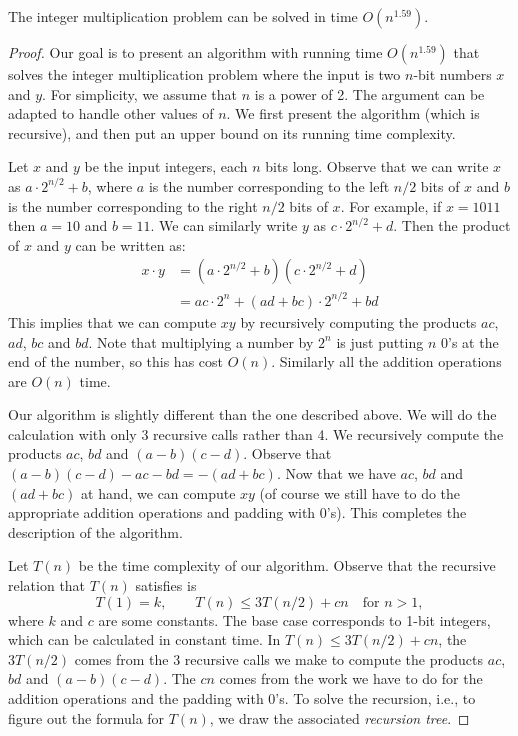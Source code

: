 \begin{flex}
\begin{theorem} \label{theorem:Karatsuba-algorithm-for-integer-multiplication}
The integer multiplication problem can be solved in time $O(n^{1.59})$.
\end{theorem}

\begin{proof}
Our goal is to present an algorithm with running time $O(n^{1.59})$ that solves the integer multiplication problem where the input is two $n$-bit numbers $x$ and $y$. For simplicity, we assume that $n$ is a power of 2. The argument can be adapted to handle other values of $n$. We first present the algorithm (which is recursive), and then put an upper bound on its running time complexity.

Let $x$ and $y$ be the input integers, each $n$ bits long. Observe that we can write $x$ as $a \cdot 2^{n/2} + b$, where $a$ is the number corresponding to the left $n/2$ bits of $x$ and $b$ is the number corresponding to the right $n/2$ bits of $x$. For example, if $x = 1011$ then $a = 10$ and $b = 11$. We can similarly write $y$ as $c \cdot 2^{n/2} + d$. Then the product of $x$ and $y$ can be written as:
\begin{align*}
x \cdot y & = (a \cdot 2^{n/2} + b)(c \cdot 2^{n/2} + d) \\
 & = ac \cdot 2^n + (ad + bc) \cdot 2^{n/2} + bd
\end{align*}
This implies that we can compute $xy$ by recursively computing the products $ac$, $ad$, $bc$ and $bd$. Note that multiplying a number by $2^n$ is just putting $n$ 0's at the end of the number, so this has cost $O(n)$. Similarly all the addition operations are $O(n)$ time.

Our algorithm is slightly different than the one described above. We will do the calculation with only 3 recursive calls rather than 4. We recursively compute the products $ac$, $bd$ and $(a-b)(c-d)$. Observe that $(a - b)(c - d) - ac - bd = -(ad + bc)$. Now that we have $ac$, $bd$ and $(ad + bc)$ at hand, we can compute $xy$  (of course we still have to do the appropriate addition operations and padding with $0$'s). This completes the description of the algorithm.

Let $T(n)$ be the time complexity of our algorithm. Observe that the recursive relation that $T(n)$ satisfies is
\[
T(1) = k, \quad \quad T(n) \leq 3T(n/2) + cn \quad \text{for $n > 1$},
\]
where $k$ and $c$ are some constants. The base case corresponds to 1-bit integers, which can be calculated in constant time. In $T(n) \leq 3T(n/2) + cn$, the $3T(n/2)$ comes from the 3 recursive calls we make to compute the products $ac$, $bd$ and $(a-b)(c-d)$. The $cn$ comes from the work we have to do for the addition operations and the padding with 0's. To solve the recursion, i.e., to figure out the formula for $T(n)$, we draw the associated \emph{recursion tree}.


\end{proof}
\end{flex}
